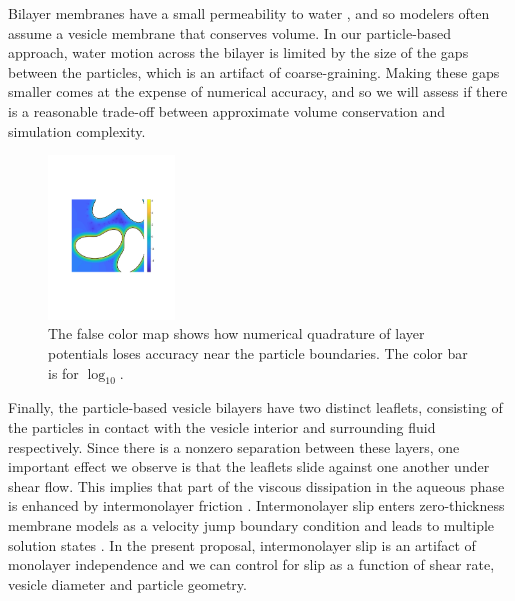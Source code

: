 Bilayer membranes have a small permeability to water \cite{323e9a2f0c58487ea82518d7a1f96485},
and so modelers often assume a vesicle membrane that conserves volume. In our particle-based approach, water motion across
the bilayer is limited by the size of the gaps between the particles, which is an artifact of coarse-graining.
Making these gaps smaller comes at the expense of numerical accuracy, and so we will assess if there is a reasonable trade-off
between approximate volume conservation and simulation complexity. 

\begin{figure}
\centerline{\includegraphics[width=0.30\textwidth]{figures/BIError.pdf}}
\caption{
\label{fig:bierror}  
The false color map shows how numerical quadrature of layer
potentials loses accuracy near the particle boundaries.
The color bar is for $\log_{10}.$ 
}
\end{figure}

Finally, the particle-based vesicle bilayers have two distinct leaflets,
consisting of the particles in contact with the vesicle interior and 
surrounding fluid respectively. Since there is a nonzero separation between these layers,
one important effect we observe is that the leaflets slide against one another under shear flow. 
This implies that part of the viscous dissipation in the aqueous phase is enhanced by intermonolayer friction
\cite{SHKULIPA2005823, ShkulipaThesis}.
Intermonolayer slip enters zero-thickness membrane models as a velocity jump boundary condition
and leads to multiple solution states \cite{schwalbe_vlahovska_miksis_2010}.
In the present proposal, intermonolayer slip is an artifact of monolayer independence  
and we can control for slip as a function of shear rate, vesicle diameter and particle geometry.

